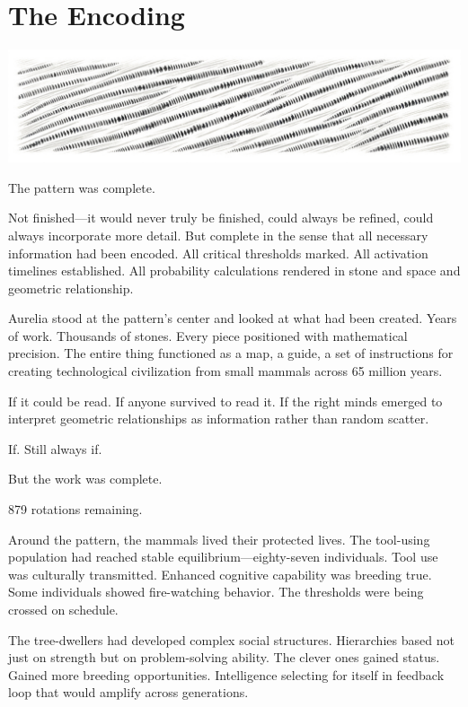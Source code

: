 \chapter{The Encoding}
\label{ch:09}



\begin{center}
\includegraphics[width=\textwidth]{images/chapterImages/genesis_sketch_00077_.png}
\end{center}

The pattern was complete.

Not finished—it would never truly be finished, could always be refined, could always incorporate more detail. But complete in the sense that all necessary information had been encoded. All critical thresholds marked. All activation timelines established. All probability calculations rendered in stone and space and geometric relationship.

Aurelia stood at the pattern's center and looked at what had been created. Years of work. Thousands of stones. Every piece positioned with mathematical precision. The entire thing functioned as a map, a guide, a set of instructions for creating technological civilization from small mammals across 65 million years.

If it could be read. If anyone survived to read it. If the right minds emerged to interpret geometric relationships as information rather than random scatter.

If. Still always if.

But the work was complete.

879 rotations remaining.

\scenebreak

Around the pattern, the mammals lived their protected lives. The tool-using population had reached stable equilibrium—eighty-seven individuals. Tool use was culturally transmitted. Enhanced cognitive capability was breeding true. Some individuals showed fire-watching behavior. The thresholds were being crossed on schedule.

The tree-dwellers had developed complex social structures. Hierarchies based not just on strength but on problem-solving ability. The clever ones gained status. Gained more breeding opportunities. Intelligence selecting for itself in feedback loop that would amplify across generations.

